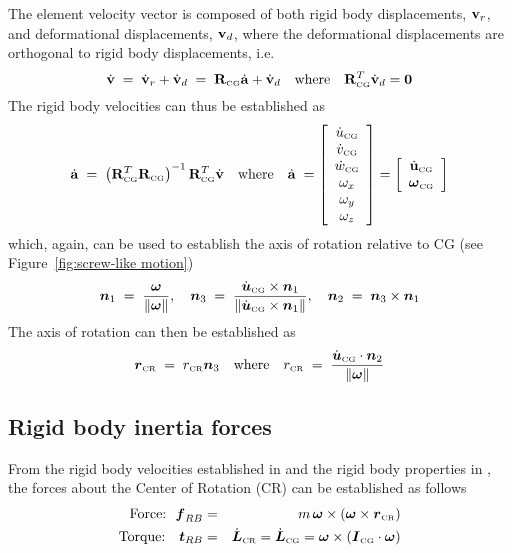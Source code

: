 The element velocity vector is composed of both rigid body displacements,
${\bf v}_r$, and deformational displacements, ${\bf v}_d$, where the
deformational displacements are orthogonal to rigid body displacements, i.e.
%
\begin{equation}
\dot{\bf v} \;=\; \dot{\bf v}_r + \dot{\bf v}_d \;=\;
{\bf R}_{\mbox{\tiny CG}} \dot{\bf a} + \dot{\bf v}_d
\quad\mbox{where}\quad
{\bf R}_{\mbox{\tiny CG}}^T \dot{\bf v}_d = {\bf 0}
\end{equation}
%
The rigid body velocities can thus be established as
%
\begin{equation}
\dot{\bf a} \;=\; \left({\bf R}_{\mbox{\tiny CG}}^T {\bf R}_{\mbox{\tiny CG}}\right)^{-1}
{\bf R}_{\mbox{\tiny CG}}^T \dot{\bf v}
\quad\mbox{where}\quad
\dot{\bf a} \;= \left[\begin{array}{c}
\dot{u}_{\mbox{\tiny CG}} \\ \dot{v}_{\mbox{\tiny CG}} \\ \dot{w}_{\mbox{\tiny CG}} \\
\omega_{x} \\ \omega_{y} \\ \omega_{z}
\end{array}\right] = \left[\begin{array}{c}
\dot{\bf u}_{\mbox{\tiny CG}} \\
{\boldsymbol{\omega}}_{\mbox{\tiny CG}}
\end{array}\right]
\label{eq:rigid velocity}
\end{equation}
%
which, again, can be used to establish the axis of rotation relative to CG
(see Figure~\ref{fig:screw-like motion})
%
\begin{equation}
{\boldsymbol{n}}_1 \;=\; \frac{\boldsymbol{\omega}}{\|\boldsymbol{\omega}\|},\quad
{\boldsymbol{n}}_3 \;=\; \frac{\dot{\boldsymbol{u}}_{\mbox{\tiny CG}}\times{\boldsymbol{n}}_1}{\|\dot{\boldsymbol{u}}_{\mbox{\tiny CG}}
\times{\boldsymbol{n}}_1\|},\quad
{\boldsymbol{n}}_2 \;=\; {\boldsymbol{n}}_3\times{\boldsymbol{n}}_1
\end{equation}
%
The axis of rotation can then be established as
%
\begin{equation}
{\boldsymbol{r}}_{\mbox{\tiny CR}} \;=\; r_{\mbox{\tiny CR}}{\boldsymbol{n}}_3 \quad\mbox{where}\quad
r_{\mbox{\tiny CR}} \;=\; \frac{\dot{\boldsymbol{u}}_{\mbox{\tiny CG}} \cdot {\boldsymbol{n}}_2}{\|{\boldsymbol{\omega}}\|}
\end{equation}

\subsection{Rigid body inertia forces}
\label{subs:Rigid body inertia forces}

From the rigid body velocities established in 
and the rigid body properties in ,
the forces about the Center of Rotation (CR) can be established as follows
%
\begin{eqnarray}
\mbox{Force:~~}  {\boldsymbol{f}}_{RB} &=&
m\,{\boldsymbol{\omega}}\times\left({\boldsymbol{\omega}}\times{\boldsymbol{r}}_{\mbox{\tiny CR}}\right) \\
\mbox{Torque:~~~}{\boldsymbol{t}}_{RB} &=&
\dot{\boldsymbol{L}}_{\mbox{\tiny CR}} = \dot{\boldsymbol{L}}_{\mbox{\tiny CG}} =
\boldsymbol{\omega}\times\left({\boldsymbol{I}}_{\mbox{\tiny CG}}\cdot\boldsymbol{\omega}\right)
\end{eqnarray}

